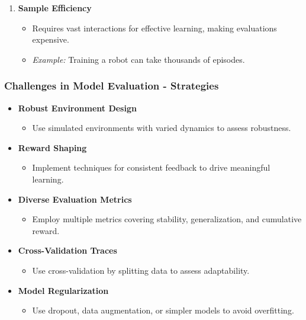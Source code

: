 \documentclass{beamer}
\begin{document}
\begin{frame}[fragile]
\begin{enumerate}
        \item \textbf{Sample Efficiency}
        \begin{itemize}
            \item Requires vast interactions for effective learning, making evaluations expensive.
            \item \textit{Example:} Training a robot can take thousands of episodes.
        \end{itemize}
    \end{enumerate}
\end{frame}

\begin{frame}[fragile]
    \frametitle{Challenges in Model Evaluation - Strategies}
    \begin{itemize}
        \item \textbf{Robust Environment Design}
        \begin{itemize}
            \item Use simulated environments with varied dynamics to assess robustness.
        \end{itemize}

        \item \textbf{Reward Shaping}
        \begin{itemize}
            \item Implement techniques for consistent feedback to drive meaningful learning.
        \end{itemize}

        \item \textbf{Diverse Evaluation Metrics}
        \begin{itemize}
            \item Employ multiple metrics covering stability, generalization, and cumulative reward.
        \end{itemize}

        \item \textbf{Cross-Validation Traces}
        \begin{itemize}
            \item Use cross-validation by splitting data to assess adaptability.
        \end{itemize}

        \item \textbf{Model Regularization}
        \begin{itemize}
            \item Use dropout, data augmentation, or simpler models to avoid overfitting.
        \end{itemize}
    \end{itemize}
\end{frame}
\end{document}

